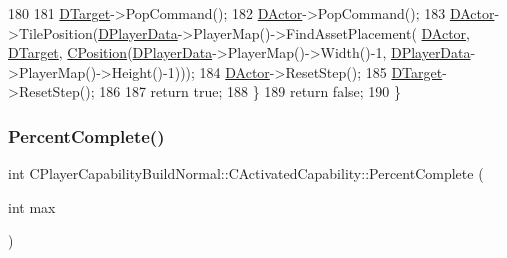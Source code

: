 \begin{DoxyCode}
180         
181         \hyperlink{classCActivatedPlayerCapability_a8a1cf50b6501bcfd55af0c935828e395}{DTarget}->PopCommand();
182         \hyperlink{classCActivatedPlayerCapability_a54ca944b47bff2718330639941d402b0}{DActor}->PopCommand();
183         \hyperlink{classCActivatedPlayerCapability_a54ca944b47bff2718330639941d402b0}{DActor}->TilePosition(\hyperlink{classCActivatedPlayerCapability_a9bf27c322a73f4b11c8183cc1973c3d8}{DPlayerData}->PlayerMap()->FindAssetPlacement(
      \hyperlink{classCActivatedPlayerCapability_a54ca944b47bff2718330639941d402b0}{DActor}, \hyperlink{classCActivatedPlayerCapability_a8a1cf50b6501bcfd55af0c935828e395}{DTarget}, \hyperlink{classCPosition}{CPosition}(\hyperlink{classCActivatedPlayerCapability_a9bf27c322a73f4b11c8183cc1973c3d8}{DPlayerData}->PlayerMap()->Width()-1, 
      \hyperlink{classCActivatedPlayerCapability_a9bf27c322a73f4b11c8183cc1973c3d8}{DPlayerData}->PlayerMap()->Height()-1)));
184         \hyperlink{classCActivatedPlayerCapability_a54ca944b47bff2718330639941d402b0}{DActor}->ResetStep();
185         \hyperlink{classCActivatedPlayerCapability_a8a1cf50b6501bcfd55af0c935828e395}{DTarget}->ResetStep();
186         
187         \textcolor{keywordflow}{return} \textcolor{keyword}{true};    
188     \}
189     \textcolor{keywordflow}{return} \textcolor{keyword}{false};
190 \}
\end{DoxyCode}
\hypertarget{classCPlayerCapabilityBuildNormal_1_1CActivatedCapability_a40bf27f9dfe88ad17a51ebb12c078568}{}\label{classCPlayerCapabilityBuildNormal_1_1CActivatedCapability_a40bf27f9dfe88ad17a51ebb12c078568} 
\subsubsection{\texorpdfstring{Percent\+Complete()}{PercentComplete()}}
{\footnotesize\ttfamily int C\+Player\+Capability\+Build\+Normal\+::\+C\+Activated\+Capability\+::\+Percent\+Complete (\begin{DoxyParamCaption}\item[{int}]{max }\end{DoxyParamCaption})\hspace{0.3cm}{\ttfamily [virtual]}}



